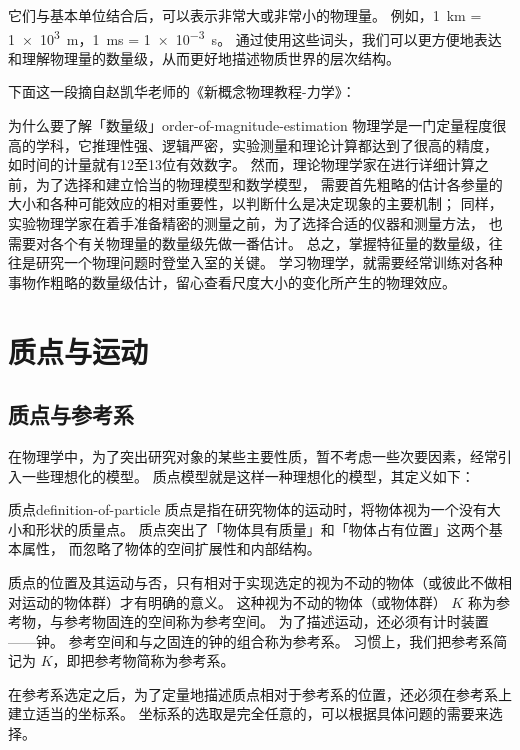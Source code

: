 它们与基本单位结合后，可以表示非常大或非常小的物理量。
例如，\qty{1}{\kilo\meter} = \qty{1e3}{\meter}，\qty{1}{\milli\second} = \qty{1e-3}{\second}。
通过使用这些词头，我们可以更方便地表达和理解物理量的数量级，从而更好地描述物质世界的层次结构。

下面这一段摘自赵凯华老师的《新概念物理教程-力学》\cite{zhaokaihua2004}：
\begin{physcite}{为什么要了解「数量级」}{order-of-magnitude-estimation}
    物理学是一门定量程度很高的学科，它推理性强、逻辑严密，实验测量和理论计算都达到了很高的精度，
    如时间的计量就有12至13位有效数字。
    然而，理论物理学家在进行详细计算之前，为了选择和建立恰当的物理模型和数学模型，
    需要首先粗略的估计各参量的大小和各种可能效应的相对重要性，以判断什么是决定现象的主要机制；
    同样，实验物理学家在着手准备精密的测量之前，为了选择合适的仪器和测量方法，
    也需要对各个有关物理量的数量级先做一番估计。
    总之，掌握特征量的数量级，往往是研究一个物理问题时登堂入室的关键。
    学习物理学，就需要经常训练对各种事物作粗略的数量级估计，留心查看尺度大小的变化所产生的物理效应。
\end{physcite}

\section{质点与运动}\label{sec:particle-and-motion}

\subsection{质点与参考系}\label{subsec:particle-and-reference-frame}

在物理学中，为了突出研究对象的某些主要性质，暂不考虑一些次要因素，经常引入一些理想化的模型。
质点模型就是这样一种理想化的模型，其定义如下：
\begin{definition}{质点}{definition-of-particle}
    质点是指在研究物体的运动时，将物体视为一个没有大小和形状的质量点。
    质点突出了「物体具有质量」和「物体占有位置」这两个基本属性，
    而忽略了物体的空间扩展性和内部结构。
\end{definition}

质点的位置及其运动与否，只有相对于实现选定的视为不动的物体（或彼此不做相对运动的物体群）才有明确的意义。
这种视为不动的物体（或物体群） $ K $ 称为参考物，与参考物固连的空间称为参考空间。
为了描述运动，还必须有计时装置——钟。
参考空间和与之固连的钟的组合称为参考系。
习惯上，我们把参考系简记为 $ K $，即把参考物简称为参考系。

在参考系选定之后，为了定量地描述质点相对于参考系的位置，还必须在参考系上建立适当的坐标系。
坐标系的选取是完全任意的，可以根据具体问题的需要来选择。

